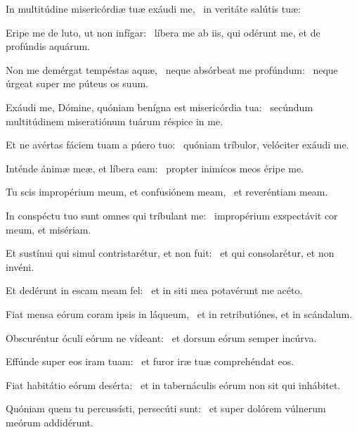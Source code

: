 \item In multitúdine misericórdiæ tuæ exáudi me,~\psstar{} in veritáte salútis tuæ:

\item Eripe me de luto, ut non infígar:~\psstar{} líbera me ab iis, qui odérunt me, et de profúndis aquárum.

\item Non me demérgat tempéstas aquæ,~\pscross{} neque absórbeat me profúndum:~\psstar{} neque úrgeat super me púteus os suum.

\item Exáudi me, Dómine, quóniam benígna est misericórdia tua:~\psstar{} secúndum multitúdinem miseratiónum tuárum réspice in me.

\item Et ne avértas fáciem tuam a púero tuo:~\psstar{} quóniam tríbulor, velóciter exáudi me.

\item Inténde ánimæ meæ, et líbera eam:~\psstar{} propter inimícos meos éripe me.

\item Tu scis impropérium meum, et confusiónem meam,~\psstar{} et reveréntiam meam.

\item In conspéctu tuo sunt omnes qui tríbulant me:~\psstar{} impropérium exspectávit cor meum, et misériam.

\item Et sustínui qui simul contristarétur, et non fuit:~\psstar{} et qui consolarétur, et non invéni.

\item Et dedérunt in escam meam fel:~\psstar{} et in siti mea potavérunt me acéto.

\item Fiat mensa eórum coram ipsis in láqueum,~\psstar{} et in retributiónes, et in scándalum.

\item Obscuréntur óculi eórum ne vídeant:~\psstar{} et dorsum eórum semper incúrva.

\item Effúnde super eos iram tuam:~\psstar{} et furor iræ tuæ comprehéndat eos.

\item Fiat habitátio eórum desérta:~\psstar{} et in tabernáculis eórum non sit qui inhábitet.

\item Quóniam quem tu percussísti, persecúti sunt:~\psstar{} et super dolórem vúlnerum meórum addidérunt.

